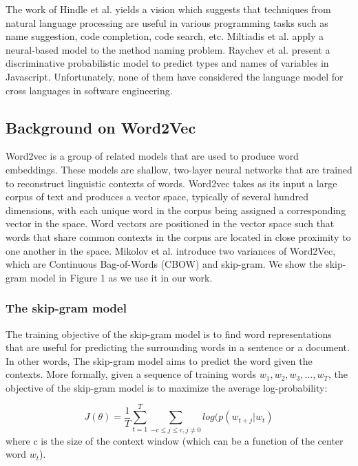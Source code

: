 The work of Hindle et al. \cite{hindle2012naturalness} yields a vision which suggests that techniques from natural language processing are useful in various programming tasks such as name suggestion, code completion, code search, etc. Miltiadis et al. \cite{allamanis2015suggesting} apply a neural-based model to the method naming problem. Raychev et al.\cite{raychev2015predicting} present a discriminative probabilistic model to predict types and names of variables in Javascript. Unfortunately, none of them have considered the language model for cross languages in software engineering.

\subsection{Background on Word2Vec}

Word2vec is a group of related models that are used to produce word embeddings. These models are shallow, two-layer neural networks that are trained to reconstruct linguistic contexts of words. Word2vec takes as its input a large corpus of text and produces a vector space, typically of several hundred dimensions, with each unique word in the corpus being assigned a corresponding vector in the space. Word vectors are positioned in the vector space such that words that share common contexts in the corpus are located in close proximity to one another in the space. Mikolov et al.\cite{mikolov2013distributed} introduce two variances of Word2Vec, which are Continuous Bag-of-Words (CBOW) and skip-gram. We show the skip-gram model in Figure 1 as we use it in our work.

\subsubsection{The skip-gram model}
The training objective of the skip-gram model is to find word representations that are useful for predicting the surrounding words in a sentence or a document. In other words, The skip-gram model aims to predict the word given the contexts. More formally, given a sequence of training words \begin{math}w_{1}, w_{2}, w_{3}, . . . , w_{T}\end{math}, the objective of the skip-gram model is to maximize the average log-probability:


\begin{displaymath}
J(\theta) = \frac{1}{T} \sum_{t=1}^T \sum_{-c\leq j\leq c,j\neq0} log(p(w_{t+j}|w_{t})
\end{displaymath}
where c is the size of the context window (which can be a function of the center word \begin{math}w_{t}\end{math}).

